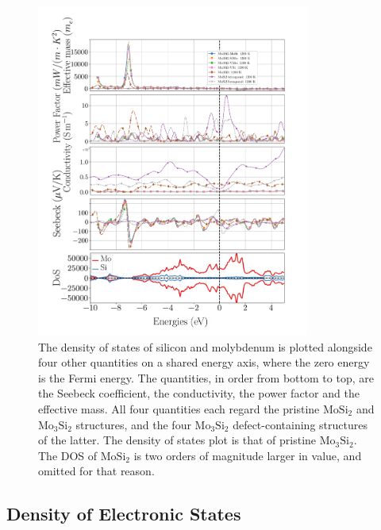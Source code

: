 \documentclass[7.5pt]{article}
\theoremstyle{plain}
\theoremstyle{definition}
\newcommand{\<}{\langle}
\renewcommand{\>}{\rangle}
\begin{document}
\begin{figure}
\centering
\includegraphics[width=0.8\textwidth]{E-plots}
  \caption{The density of states of silicon and molybdenum is plotted alongside four other quantities on a shared energy axis, where the zero energy is the Fermi energy. The quantities, in order from bottom to top, are the Seebeck coefficient, the conductivity, the power factor and the effective mass. All four quantities each regard the pristine $\text{Mo}\text{Si}_2$ and $\text{Mo}_3\text{Si}_2$ structures, and the four $\text{Mo}_3\text{Si}_2$ defect-containing structures of the latter. The density of states plot is that of pristine $\text{Mo}_3\text{Si}_2$. The DOS of $\text{Mo}\text{Si}_2$ is two orders of magnitude larger in value, and omitted for that reason.}
\label{fig:e-plots}
\end{figure}

\clearpage
\subsection{Density of Electronic States}
\end{document}
